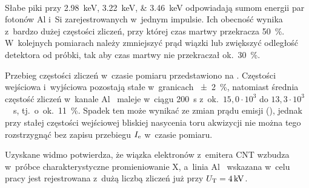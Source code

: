 \paragraph{}
\label{sec:widma-stabilnosc}

Słabe piki przy \SIlist{2.98;3.22;3.46}{\kilo\electronvolt} odpowiadają sumom
energii par fotonów Al i~Si zarejestrowanych w~jednym impulsie. Ich obecność
wynika z~bardzo dużej częstości zliczeń, przy której czas martwy przekracza
\SI{50}{\percent}. W~kolejnych pomiarach należy zmniejszyć prąd wiązki lub
zwiększyć odległość detektora od próbki, tak aby czas martwy nie przekraczał
ok.~\SI{30}{\percent}.

Przebieg częstości zliczeń w~czasie pomiaru przedstawiono na .
Częstości wejściowa i~wyjściowa pozostają stałe w~granicach \SI{\pm2}{\percent},
natomiast średnia częstość zliczeń w~kanale Al~\Ka{} maleje w~ciągu \SI{200}{\second}
z~ok.~$15{,}0\cdot10^{3}$ do $13{,}3\cdot10^{3}$~\si{\per\second}, tj.~o~ok.~\SI{11}{\percent}.
Spadek ten może wynikać ze zmian prądu emisji (), jednak
przy stałej częstości wejściowej bliskiej nasycenia toru akwizycji nie można
tego rozstrzygnąć bez zapisu przebiegu $I_\mathrm{e}$ w~czasie pomiaru.


Uzyskane widmo potwierdza, że wiązka elektronów z~emitera CNT wzbudza
w~próbce charakterystyczne promieniowanie X, a~linia Al~\Ka{} wskazana
w~celu pracy jest rejestrowana z~dużą liczbą zliczeń już przy
$U_\mathrm{T}=\SI{4}{\kilo\volt}$.
